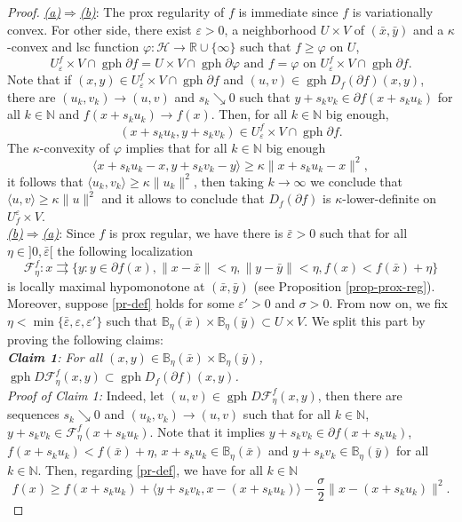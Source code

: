 \documentclass[smallextended,envcountsect,envcountsame]{svjour3}
\renewcommand{\H}{\mathcal{H}}
\newcommand{\R}{\mathbb{R}}
\newcommand{\N}{\mathbb{N}}
\newcommand{\tto}{\rightrightarrows}
\newcommand{\gph}{\operatorname{gph}}
\renewcommand{\epsilon}{\varepsilon}
\newcommand{\1}{\mathds{1}}
\begin{document}
	\begin{proof}
		\underline{\emph{(a)}$\Rightarrow$\emph{(b)}}: The prox regularity of $f$ is immediate since $f$ is variationally convex. For other side, there exist $\epsilon>0$, a neighborhood $U\times V$ of $(\bar x,\bar y)$ and a $\kappa$-convex and lsc function $\varphi\colon \H\to\R\cup\{\infty\}$ such that $f\geq \varphi$ on $U$, $$U_\epsilon^f\times V\cap \gph \partial f = U\times V\cap \gph \partial \varphi\text{ and } f=\varphi \text{ on } U_\epsilon^f\times V\cap \gph \partial f.$$ 
		Note that if $(x,y)\in U_\epsilon^f\times V\cap \gph \partial f$ and $(u,v)\in \gph D_f(\partial f)(x,y)$, there are $(u_k,v_k)\to (u,v)$ and $s_k\searrow 0$ such that $y+s_k v_k\in \partial f(x+s_ku_k)$ for all $k\in\N$ and $f(x + s_k u_k)\to f(x)$. Then, for all $k\in\N$ big enough, $$(x+s_k u_k,y+s_k v_k)\in U_\epsilon^f\times V\cap\gph \partial f.$$ The $\kappa$-convexity of $\varphi$ implies that for all $k\in\N$ big enough $$\langle x+s_k u_k - x,y+s_k v_k - y\rangle\geq \kappa\|x+s_k u_k - x\|^2,$$
		it follows that $\langle u_k,v_k\rangle\geq \kappa\|u_k\|^2 $, then taking $k\to\infty$ we conclude that $\langle u,v\rangle\geq \kappa\|u\|^2$ and it allows to conclude that $D_f(\partial f)$ is $\kappa$-lower-definite on $U_f^\epsilon\times V$.\\ 
		\underline{\emph{(b)}$\Rightarrow$\emph{(a)}}: Since $f$ is prox regular, we have there is $\bar \epsilon>0$ such that for all $\eta\in ]0,\bar \epsilon[$ the following localization $$\mathscr{F}_\eta^f\colon x\tto \{y : y\in \partial f(x) , \|x-\bar x\|<\eta, \|y-\bar y\|<\eta, f(x)<f(\bar x) + \eta \}$$ is locally maximal hypomonotone at $(\bar x,\bar y)$ (see Proposition \ref{prop-prox-reg}). Moreover, suppose \eqref{pr-def} holds for some $\epsilon'>0$ and $\sigma>0$. From now on, we fix $\eta<\min\{\bar \epsilon, \epsilon, \epsilon'\}$ such that $\mathbb{B}_\eta(\bar x)\times \mathbb{B}_\eta(\bar y)\subset U\times V$. We split this part by proving the following claims:\\
		{\emph{{\bf Claim 1}: For all $(x,y)\in \mathbb{B}_{\eta}(\bar x)\times \mathbb{B}_{\eta}(\bar y)$, $\gph D\mathscr{F}_\eta^f(x,y) \subset \gph D_f(\partial f)(x,y)$. }}\\
		\emph{Proof of Claim 1:} Indeed, let $(u,v)\in \gph D\mathscr{F}_\eta^f(x,y)$, then there are sequences $s_k\searrow 0$ and $(u_k,v_k)\to (u,v)$ such that for all $k\in\N$, $y+s_k v_k\in\mathscr{F}_\eta^f(x+s_k u_k)$. Note that it implies $y+s_k v_k\in \partial f(x+s_k u_k)$, $f(x+s_k u_k)<f(\bar x) + \eta$, $x+s_k u_k\in \mathbb{B}_{\eta}(\bar x)$ and $y+s_k v_k\in \mathbb{B}_{\eta}(\bar y)$ for all $k\in \N$. Then, regarding \eqref{pr-def}, we have for all $k\in\N$ $$f(x)\geq f(x+s_k u_k) + \langle y+s_k v_k, x-(x+s_k u_k)\rangle - \frac{\sigma}{2}\|x-(x+s_k u_k)\|^2.$$

\end{proof}
\end{document}

